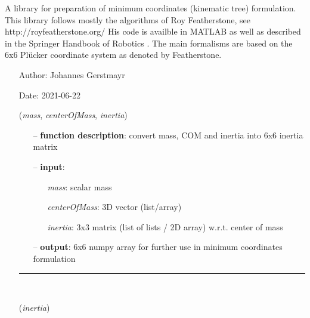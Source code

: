 \begin{itemize}[leftmargin=1.4cm]
\begin{itemize}[leftmargin=0.5cm]
\begin{itemize}[leftmargin=1.4cm]
\begin{itemize}[leftmargin=0.5cm]
\begin{itemize}[leftmargin=1.4cm]
\begin{itemize}[leftmargin=0.5cm]
\begin{itemize}[leftmargin=1.4cm]
\begin{itemize}[leftmargin=1.4cm]
%
\label{sec:module:kinematicTree}
  A library for preparation of minimum coordinates (kinematic tree) formulation.
			This library follows mostly the algorithms of Roy Featherstone, see http://royfeatherstone.org/
           His code is availble in MATLAB as well as described in the Springer Handbook of Robotics \cite{Siciliano2016}.
			The main formalisms are based on the 6x6 Pl\"ucker coordinate system as denoted by Featherstone.
\begin{itemize}[leftmargin=1.4cm]
\setlength{\itemindent}{-1.4cm}
\item[]Author:    Johannes Gerstmayr
\item[]Date:      2021-06-22
\ei
\begin{flushleft}
\label{sec:kinematicTree:MassCOMinertia2T66}
({\it mass}, {\it centerOfMass}, {\it inertia})
\end{flushleft}
\setlength{\itemindent}{0.7cm}
\begin{itemize}[leftmargin=0.7cm]
  \item[--]  {\bf function description}: convert mass, COM and inertia into 6x6 inertia matrix  \item[--]  {\bf input}: \vspace{-6pt}
  \begin{itemize}[leftmargin=1.2cm]
\setlength{\itemindent}{-0.7cm}
    \item[] {\it mass}: scalar mass
    \item[] {\it   centerOfMass}: 3D vector (list/array)
    \item[] {\it   inertia}: 3x3 matrix (list of lists / 2D array) w.r.t. center of mass
  \end{itemize}
  \item[--]  {\bf output}: 6x6 numpy array for further use in minimum coordinates formulation\vspace{12pt}\end{itemize}
%
\noindent\rule{8cm}{0.75pt}\vspace{1pt} \\ 
\begin{flushleft}
\label{sec:kinematicTree:Inertia2T66}
({\it inertia})
\end{flushleft}
\setlength{\itemindent}{0.7cm}

\end{itemize}
\end{itemize}
\end{itemize}
\end{itemize}
\end{itemize}
\end{itemize}
\end{itemize}
\end{itemize}
\end{itemize}
